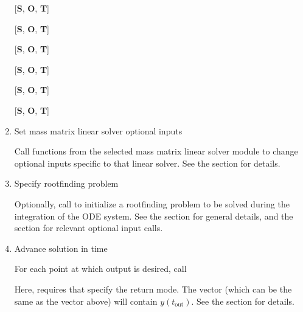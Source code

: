 \documentclass[letterpaper,10pt,english]{sphinxmanual}
\begin{document}
\begin{enumerate}
{[}\textbf{S}, \textbf{O}, \textbf{T}{]} 

{[}\textbf{S}, \textbf{O}, \textbf{T}{]} 

{[}\textbf{S}, \textbf{O}, \textbf{T}{]} 

{[}\textbf{S}, \textbf{O}, \textbf{T}{]} 

{[}\textbf{S}, \textbf{O}, \textbf{T}{]} 

{[}\textbf{S}, \textbf{O}, \textbf{T}{]} 






\item {} 
Set mass matrix linear solver optional inputs

Call  functions from the selected mass matrix linear
solver module to change optional inputs specific to that linear
solver. See the section {\hyperref[c_interface/User_callable:cinterface-optionalinputs]{\emph{}}} for details.

\item {} 
Specify rootfinding problem

Optionally, call {\hyperref[c_interface/User_callable:c.ARKodeRootInit]{\emph{}}} to initialize a rootfinding
problem to be solved during the integration of the ODE system. See
the section {\hyperref[c_interface/User_callable:cinterface-rootfinding]{\emph{}}} for general details, and
the section {\hyperref[c_interface/User_callable:cinterface-optionalinputs]{\emph{}}} for relevant optional
input calls.

\item {} 
Advance solution in time

For each point at which output is desired, call


Here, {\hyperref[c_interface/User_callable:c.ARKode]{\emph{}}} requires that 
specify the return mode. The vector  (which can be the same as
the vector  above) will contain \(y(t_\text{out})\). See the section
{\hyperref[c_interface/User_callable:cinterface-integration]{\emph{}}} for details.


\end{enumerate}
\end{document}
